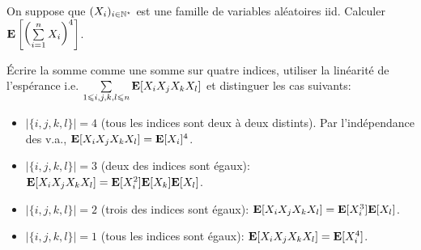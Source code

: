 \begin{exercice}
    On suppose que $(X_i)_{i \in \mathbb{N}^\star}$ est une famille de variables aléatoires iid. Calculer $\mathbf{E} \left [ \left (\sum\limits_{i=1}^{n} X_i \right)^4 \right]$.
\end{exercice}

\begin{elem_sol}
    Écrire la somme comme une somme sur quatre indices, utiliser la linéarité de l'espérance i.e. $\sum\limits_{1 \leqslant i, j, k, l \leqslant n} \mathbf{E}[X_i X_j X_k X_l]$ et distinguer les cas suivants:
    \begin{itemize}
        \item $|\{i, j, k, l \}| = 4$ (tous les indices sont deux à deux distints). Par l'indépendance des v.a., $\mathbf{E}[X_i X_j X_k X_l] = \mathbf{E}[X_i]^4$.
        \item $|\{i, j, k, l \}| = 3$ (deux des indices sont égaux): $\mathbf{E}[X_i X_j X_k X_l] = \mathbf{E}[X_i^2]\mathbf{E}[X_k]\mathbf{E}[X_l]$.
        \item $|\{i, j, k, l \}| = 2$ (trois des indices sont égaux): $\mathbf{E}[X_i X_j X_k X_l] = \mathbf{E}[X_i^3]\mathbf{E}[X_l]$.
        \item $|\{i, j, k, l \}| = 1$ (tous les indices sont égaux): $\mathbf{E}[X_i X_j X_k X_l] = \mathbf{E}[X_i^4]$.
    \end{itemize}
\end{elem_sol}